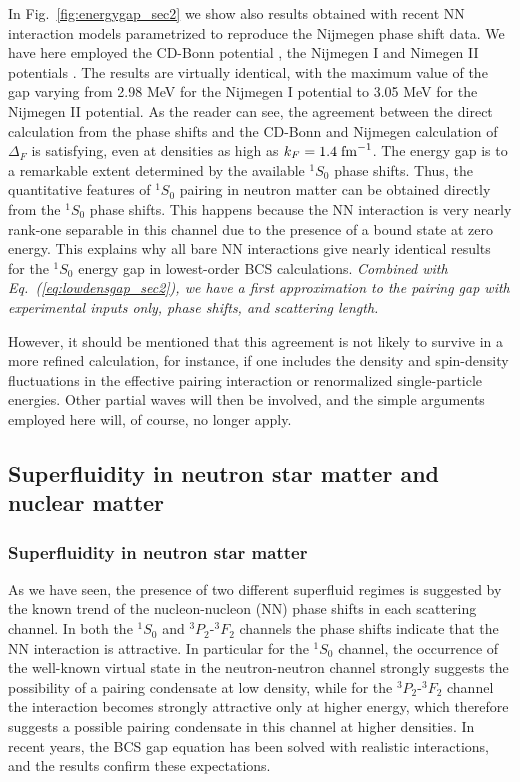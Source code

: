 \documentclass[preprint,rmp,aps,floatfix]{revtex4}
\begin{document}
In Fig.~\ref{fig:energygap_sec2} we show also results obtained
with recent NN interaction models parametrized to reproduce the
Nijmegen phase shift data. We have here employed  
the CD-Bonn potential \cite{cdbonn96},  
the Nijmegen I and Nimegen II potentials \cite{nijmegen94}. 
The results are virtually identical, with the maximum value 
of the gap varying from 2.98 MeV for the Nijmegen I potential to 3.05 MeV 
for the Nijmegen II potential.  
As the reader can see, the agreement 
between the direct calculation from the phase shifts and the CD-Bonn and
Nijmegen 
calculation of $\Delta_F$ is satisfying, even 
at densities as high as $k_F=1.4\;{\rm fm}^{-1}$.  The energy gap 
is to a remarkable extent determined by the available $^1S_0$ phase shifts. 
Thus, the quantitative features 
of $^1S_0$ pairing in neutron matter can be obtained directly from 
the $^1S_0$ phase shifts. This happens because the NN interaction 
is very nearly rank-one separable in this channel due to the presence 
of a bound state at zero energy.  This explains why all bare NN interactions 
give nearly identical results for the $^1S_0$ energy gap in lowest-order 
BCS calculations.  {\em Combined with Eq.~(\ref{eq:lowdensgap_sec2}), we have a
first approximation to the pairing gap 
with experimental inputs only, phase shifts, and scattering length.}

However, 
it should be mentioned that this agreement 
is not likely to survive in a more refined calculation, for instance, 
if one includes the density and spin-density fluctuations in the 
effective pairing interaction or renormalized single-particle energies.
Other partial waves will then be involved, and the simple arguments 
employed here will, of course, no longer apply. 






\subsection{Superfluidity in neutron star matter and nuclear matter}
\label{subsec:NN_to_pairing_sec3}

\subsubsection{Superfluidity in neutron star matter}

As we have seen, the  
presence of two different superfluid regimes 
is suggested by the known trend of the 
nucleon-nucleon (NN) phase shifts 
in each scattering channel. 
In both the $^1S_0$ and $^3P_2$-$^3F_2$ channels the
phase shifts indicate that the NN interaction is attractive. 
In particular for the $^1S_0$ channel, the occurrence of 
the well-known virtual state in the neutron-neutron channel
strongly suggests the possibility of a 
pairing condensate at low density, 
while for the $^3P_2$-$^3F_2$ channel the 
interaction becomes strongly attractive only
at higher energy, which therefore suggests a possible 
pairing condensate
in this channel at higher densities. 
In recent years, the BCS gap equation
has been solved with realistic interactions, 
and the results confirm
these expectations. 
\end{document}
